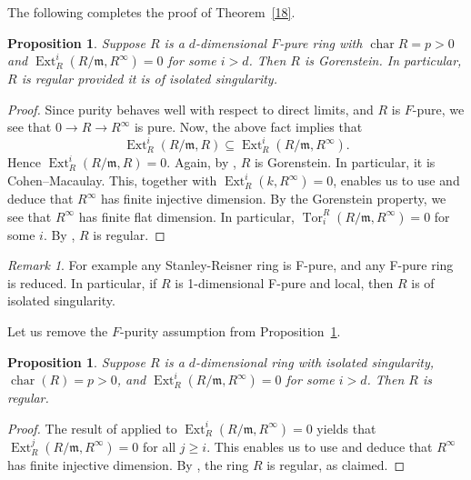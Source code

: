 \documentclass[11pt,a4paper]{amsart}
\numberwithin{equation}{section}
\newtheorem{proposition}[theorem]{Proposition}
\theoremstyle{definition}
\theoremstyle{remark}
\newtheorem{remark}[theorem]{Remark}
\begin{document}
The following completes the proof of Theorem~\ref{18}.

\begin{proposition}\label{5.15}
	Suppose \(R\) is a \(d\)-dimensional \(F\)-pure ring with \(\operatorname{char} R = p > 0\) and
	\(
	\operatorname{Ext}_R^i(R/\mathfrak{m}, R^\infty) = 0
	\)
	for some \(i > d\). Then \(R\) is Gorenstein. In particular, \(R\) is regular provided it is of isolated singularity.
\end{proposition}

\begin{proof}
	Since purity behaves well with respect to direct limits, and \(R\) is \(F\)-pure, we see that \(0 \to R \to R^\infty\) is pure. Now, the above fact implies that
	\[
	\operatorname{Ext}_R^i(R/\mathfrak{m}, R) \subseteq \operatorname{Ext}_R^i(R/\mathfrak{m}, R^\infty).
	\]
	Hence \(\operatorname{Ext}_R^i(R/\mathfrak{m}, R) = 0\). Again, by \cite{Ro2}, \(R\) is Gorenstein. In particular, it is Cohen--Macaulay. This, together with \(\operatorname{Ext}_R^i(k, R^\infty) = 0\), enables us to use \cite[page 226]{sc3} and deduce that \(R^\infty\) has finite injective dimension.
By the Gorenstein property, we see that \(R^\infty\) has finite flat dimension. In particular, \(\operatorname{Tor}_i^R(R/\mathfrak{m}, R^\infty) = 0\) for some \(i\). By \cite[3.6]{ABEr}, \(R\) is regular.
\end{proof}

\begin{remark}
For example
any  Stanley-Reisner ring
is F-pure, and any F-pure ring is reduced. In particular, if $R$ is 1-dimensional F-pure and local,
then $R$ is of isolated singularity.
\end{remark}
Let us remove the \(F\)-purity assumption from Proposition~\ref{5.15}.

\begin{proposition}\label{517}
	Suppose \(R\) is a \(d\)-dimensional ring with isolated singularity, \(\operatorname{char}(R) = p > 0\), and
	\(
	\operatorname{Ext}_R^i(R/\mathfrak{m}, R^\infty) = 0
	\)
	for some \(i > d\). Then \(R\) is regular.
\end{proposition}

\begin{proof}
	The result of \cite[1.2]{IYENGAR} applied to \(\operatorname{Ext}_R^i(R/\mathfrak{m}, R^\infty) = 0\) yields that
	\(
	\operatorname{Ext}_R^j(R/\mathfrak{m}, R^\infty) = 0
	\)
	for all \(j \ge i\). This enables us to use \cite[Theorem VI.9]{sc3} and deduce that \(R^\infty\) has finite injective dimension. By \cite[Example 3.17(i)]{ryo}, the ring \(R\) is regular, as claimed.
\end{proof}
\end{document}
